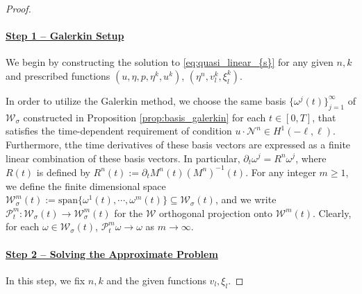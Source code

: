 \documentclass[letterpaper,reqno,10pt,twoside]{amsart}
\theoremstyle{definition}
\theoremstyle{remark}
\def\p{\partial}
\begin{document}
	\begin{proof}
		$~$
		
		\paragraph{\underline{Step 1 -- Galerkin Setup}}
		We begin by constructing the solution to \eqref{eq:quasi_linear_{s}} for any given $n,k$ and prescribed functions $(u,\eta,p,\eta^{k},u^{k})$, $(\eta^{n},v_{l}^{k},\xi_{l}^{k})$. 
		
		In order to utilize the Galerkin method, we choose the same basis $\{\omega^j(t)\}_{j=1}^\infty$ of ${}\mathcal{W}_{\sigma}$ constructed in Proposition \ref{prop:basis_galerkin} for each $t\in[0, T]$, that satisfies the time-dependent requirement of condition $u\cdot \mathcal{N}^{n}\in H^{1}(-\ell,\ell)$. Furthermore, tthe time derivatives of these basis vectors are expressed as a finite linear combination of these basis vectors. In particular, $\p_t\omega^j=R^{n}\omega^j$,
		where $R(t)$ is defined by $R^{n}(t):=\p_tM^{n}(t)(M^{n})^{-1}(t)$.
		For any integer $m\ge1$, we define the finite dimensional space
		$
		\mathcal{W}_{\sigma}^m(t):=\text{span}\{\omega^1(t), \cdots, \omega^m(t)\}\subseteq \mathcal{W}_{\sigma}(t)$,
		and we write
		$
		\mathcal{P}^m_t: \mathcal{W}_{\sigma}(t)\rightarrow\mathcal{W}_{\sigma}^m(t)
		$
		for the $\mathcal{W}$ orthogonal projection onto $\mathcal{W}^m(t)$. Clearly, for each $\omega\in \mathcal{W}_{\sigma}(t)$, $\mathcal{P}^m_t\omega\rightarrow\omega$ as $m\rightarrow\infty$.
		
		
		\paragraph{\underline{Step 2 -- Solving the Approximate Problem}} In this step, we fix $n,k$ and the given functions $v_{l},\xi_{l}$. 
		

\end{proof}
\end{document}
